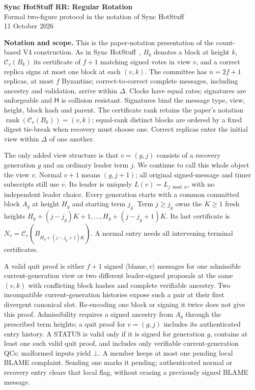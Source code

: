 \documentclass[10pt,a4paper]{article}
\newcommand{\RR}[1]{{\color{red!70!black}#1}}
\newcommand{\cert}{\mathcal C}
\newcommand{\rank}{\operatorname{rank}}
\begin{document}
\begin{center}
{\Large\bfseries Sync HotStuff RR: Regular Rotation}\\[3pt]
{\small Formal two-figure protocol in the notation of Sync HotStuff}\\[3pt]
11 October 2026
\end{center}

\textbf{Notation and scope.}
This is the paper-notation presentation of the count-based V4 construction.
As in Sync HotStuff~\cite{sync}, $B_k$ denotes a block at height $k$,
$\cert_v(B_k)$ its certificate of $f+1$ matching signed votes in view $v$,
and a correct replica signs at most one block at each $(v,k)$.
The committee has $n=2f+1$ replicas, at most $f$ Byzantine; correct-to-correct
complete messages, including ancestry and validation, arrive within $\Delta$.
Clocks have equal rates; signatures are unforgeable and $\mathsf H$ is
collision resistant. Signatures bind the message type, view, height,
block hash and parent. The certificate rank retains the paper's notation
$\rank(\cert_v(B_k))=(v,k)$; \RR{equal-rank distinct blocks are ordered by
a fixed digest tie-break when recovery must choose one.}
Correct replicas enter the initial view within $\Delta$ of one another.

\RR{The only added view structure is that $v=(g,j)$ consists of a recovery
generation $g$ and an ordinary leader term $j$. We continue to call this
whole object the view $v$. Normal $v+1$ means $(g,j+1)$; all original
signed-message and timer subscripts still use $v$. Its leader is uniquely
$L(v)=L_{j\bmod n}$, with no independent leader choice. Every generation
starts with a common committed block $A_g$ at height $H_g$ and starting term
$j_g$. Term $j\ge j_g$ owns the $K\ge1$ fresh heights
$H_g+(j-j_g)K+1,\ldots,H_g+(j-j_g+1)K$. Its last certificate is
$N_v=\cert_v(B_{H_g+(j-j_g+1)K})$. A normal entry needs all intervening
terminal certificates.}

\RR{A valid quit proof is either $f+1$ signed $\langle\mathrm{blame},v\rangle$
messages for one admissible current-generation view or two different
leader-signed proposals at the same $(v,k)$ with conflicting block hashes
and complete verifiable ancestry. Two incompatible current-generation
histories expose such a pair at their first divergent canonical slot.
Re-encoding one block or signing it twice does not give this proof.
Admissibility requires a signed ancestry from $A_g$ through the prescribed
term heights; a quit proof for $v=(g,j)$ includes its authenticated entry
history. A STATUS is valid only if it is signed for generation $g$, contains
at least one such valid quit proof, and includes only verifiable
current-generation QCs; malformed inputs yield $\bot$.}
A member keeps at most one pending local BLAME complaint. Sending one marks
it pending; authenticated normal or recovery entry clears that local flag,
without erasing a previously signed BLAME message.
\end{document}
